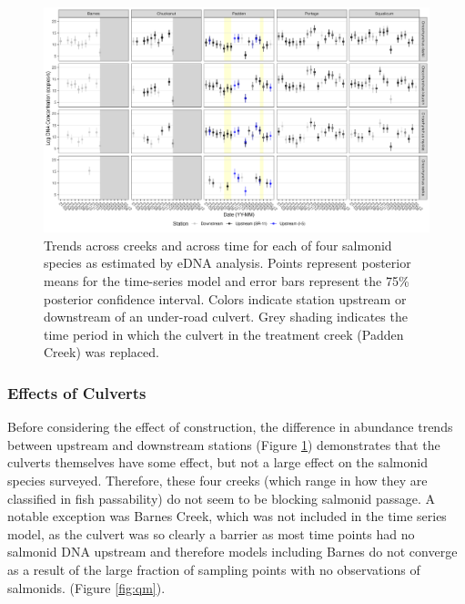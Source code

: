\documentclass[
]{article}
\begin{document}
\begin{figure}
\centering
\includegraphics{../Output/Figures/multispeciesTrends_flowcorrected.png}
\caption{Trends across creeks and across time for each of four salmonid
species as estimated by eDNA analysis. Points represent posterior means
for the time-series model and error bars represent the 75\% posterior
confidence interval. Colors indicate station upstream or downstream of
an under-road culvert. Grey shading indicates the time period in which
the culvert in the treatment creek (Padden Creek) was
replaced.\label{fig:ts}}
\end{figure}

\hypertarget{effects-of-culverts}{%
\subsubsection{Effects of Culverts}\label{effects-of-culverts}}

Before considering the effect of construction, the difference in
abundance trends between upstream and downstream stations (Figure
\ref{fig:ts}) demonstrates that the culverts themselves have some
effect, but not a large effect on the salmonid species surveyed.
Therefore, these four creeks (which range in how they are classified in
fish passability) do not seem to be blocking salmonid passage. A notable
exception was Barnes Creek, which was not included in the time series
model, as the culvert was so clearly a barrier as most time points had
no salmonid DNA upstream and therefore models including Barnes do not
converge as a result of the large fraction of sampling points with no
observations of salmonids. (Figure \ref{fig:qm}).
\end{document}
